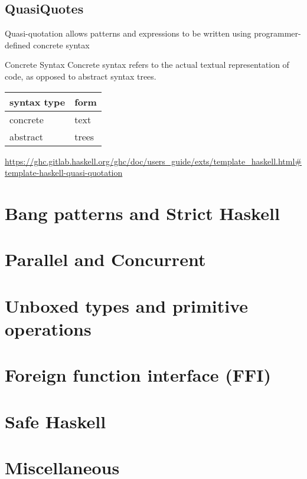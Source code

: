 \documentclass[openany, 12pt]{book}
\begin{document}
\setcounter{chapter}{6}

\chapter{QuasiQuotes}
Quasi-quotation allows patterns and expressions to be written using
programmer-defined concrete syntax

\begin{definition}{Concrete Syntax}{}
	Concrete syntax refers to the actual textual representation of code, as
	opposed to abstract syntax trees.
	\begin{center}
		\begin{tabular}{ll}
			\toprule
			syntax type & form  \\
			\midrule
			concrete    & text  \\
			abstract    & trees \\
			\bottomrule
		\end{tabular}
	\end{center}
\end{definition}

\url{https://ghc.gitlab.haskell.org/ghc/doc/users_guide/exts/template_haskell.html#template-haskell-quasi-quotation}

\part{Bang patterns and Strict Haskell}
\part{Parallel and Concurrent}
\part{Unboxed types and primitive operations}
\part{Foreign function interface (FFI)}
\part{Safe Haskell}
\part{Miscellaneous}
\end{document}
